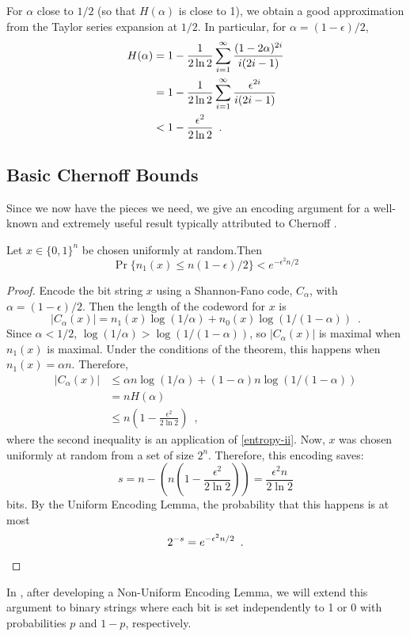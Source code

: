 \documentclass{patmorin}
\begin{document}
For $\alpha$ close to $1/2$ (so that $H(\alpha)$ is close to 1), we
obtain a good approximation from the Taylor series expansion at $1/2$. In
particular, for $\alpha=(1-\epsilon)/2$,
\begin{align}
   H(\alpha) & = 1-\frac{1}{2\ln 2}\sum_{i=1}^{\infty}\frac{(1-2\alpha)^{2i}}{i(2i-1)} 
            \notag \\ 
        & = 1-\frac{1}{2\ln 2}\sum_{i=1}^{\infty}\frac{\epsilon^{2i}}{i(2i-1)} 
             \notag \\ 
        & < 1-\frac{\epsilon^2}{2\ln 2} \enspace .\eqlabel{entropy-ii}
\end{align}

\subsection{Basic Chernoff Bounds}

Since we now have the pieces we need, we give an encoding argument
for a well-known and extremely useful result typically attributed to
Chernoff \cite{X}.

\begin{thm}
  Let $x\in\{0,1\}^n$ be chosen uniformly at random.Then
  \[  \Pr\{n_1(x) \le n(1-\epsilon)/2\} < e^{-\epsilon^2n/2} \]
\end{thm}

\begin{proof}
  Encode the bit string $x$ using a Shannon-Fano code, $C_\alpha$,
  with $\alpha=(1-\epsilon)/2$.  Then the length of the codeword for
  $x$ is
  \[
  |C_\alpha(x)| = n_1(x)\log(1/\alpha) + n_0(x)\log (1/(1-\alpha))
  \enspace .
  \]
  Since $\alpha < 1/2$, $\log(1/\alpha) > \log(1/(1-\alpha))$, so
  $|C_\alpha(x)|$ is maximal when $n_1(x)$ is maximal.  Under the
  conditions of the theorem, this happens when $n_1(x)=\alpha n$.
  Therefore,
  \begin{align*}
    |C_\alpha(x)| & \le \alpha n\log(1/\alpha) + (1-\alpha)n\log(1/(1-\alpha))\\
    & = n H(\alpha) \\
    & \le n\left(1-\frac{\epsilon^2}{2\ln 2}\right) \enspace ,
  \end{align*}
  where the second inequality is an application of \eqref{entropy-ii}.
  Now, $x$ was chosen uniformly at random from a set of size $2^n$.
  Therefore, this encoding saves:
  \[  
  s = n-\left(n\left(1-\frac{\epsilon^2}{2\ln 2}\right)\right) =
  \frac{\epsilon^2n}{2\ln 2}
  \]
  bits.  By the Uniform Encoding Lemma, the probability that this
  happens is at most
  \[
  2^{-s} = e^{-\epsilon^2n/2} \enspace . \qedhere
  \]
\end{proof}
In , after developing a Non-Uniform Encoding Lemma,
we will extend this argument to binary strings where each bit is set
independently to 1 or 0 with probabilities $p$ and $1-p$,
respectively.
\end{document}
